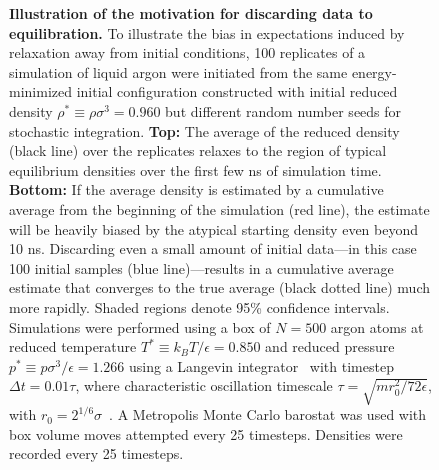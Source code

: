 \documentclass[aps,pre,twocolumn,nofootinbib,superscriptaddress,linenumbers,11point]{revtex4-1}
\begin{document}
\begin{figure} 
\caption{\label{figure:burn-in-example} {\bf Illustration of the motivation for discarding data to equilibration.} 
To illustrate the bias in expectations induced by relaxation away from initial conditions, 100 replicates of a simulation of liquid argon were initiated from the same energy-minimized initial configuration constructed with initial reduced density $\rho^* \equiv \rho \sigma^3 = 0.960$ but different random number seeds for stochastic integration.
%
{\bf Top:} The average of the reduced density (black line) over the replicates relaxes to the region of typical equilibrium densities over the first few ns of simulation time.
%
{\bf Bottom:} If the average density is estimated by a cumulative average from the beginning of the simulation (red line), the estimate will be heavily biased by the atypical starting density even beyond 10 ns.
Discarding even a small amount of initial data---in this case 100 initial samples (blue line)---results in a cumulative average estimate that converges to the true average (black dotted line) much more rapidly.
% 
Shaded regions denote 95\% confidence intervals.
%
Simulations were performed using a box of $N = 500$ argon atoms at reduced temperature $T^* \equiv k_B T / \epsilon = 0.850$ and reduced pressure $p^* \equiv p \sigma^3 / \epsilon = 1.266$ using a Langevin integrator~\cite{sivak-chodera-crooks:jpcb:2014:vvvr} with timestep $\Delta t = 0.01 \tau$, where characteristic oscillation timescale $\tau = \sqrt{m r_0^2 / 72 \epsilon}$, with $r_0 = 2^{1/6} \sigma$~\cite{liquid-argon-characteristic-timescale}.
A Metropolis Monte Carlo barostat was used with box volume moves attempted every 25 timesteps.
Densities were recorded every 25 timesteps.
}
\end{figure}

\end{document}
